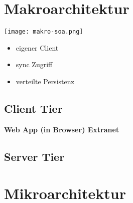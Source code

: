\section{Makroarchitektur}

\texttt{[image: makro-soa.png]}

\begin{itemize}
    \item eigener Client
    \item sync Zugriff
    \item verteilte Persistenz
\end{itemize}

\subsection{Client Tier}

\textbf{Web App (in Browser) Extranet}

\subsection{Server Tier}



\section{Mikroarchitektur}


